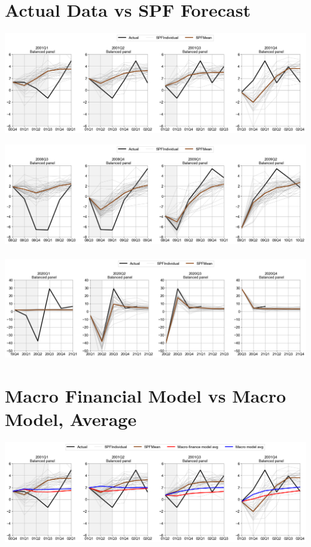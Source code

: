 \documentclass{article}
\begin{document}
\begin{landscape}
\section{\Large Actual Data vs SPF Forecast}
\includegraphics[scale=0.7]{Actual_vs_SPF_20012002}

\pagebreak
\includegraphics[scale=0.7]{Actual_vs_SPF_20082009}\\ 
\bigskip \\
\includegraphics[scale=0.7]{Actual_vs_SPF_20202021}

\pagebreak
\section{\Large Macro Financial Model vs Macro Model, Average}

\includegraphics[scale=0.7]{MacroFin_vs_Macro_avg_20012002}\\


\end{landscape}
\end{document}

